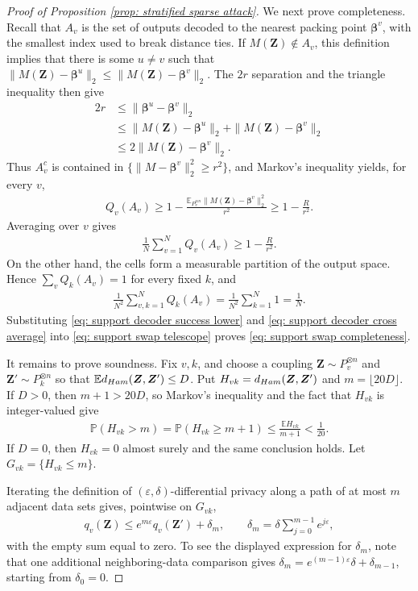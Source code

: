 \documentclass[letterpaper,12pt]{article}
\numberwithin{equation}{section}
\theoremstyle{plain}
\numberwithin{Theorem}{section}
\numberwithin{proposition}{section}
\numberwithin{Lemma}{section}
{
	\theoremstyle{definition}
	\newtheorem{Definition}{Definition}
	\newtheorem{example}{Example}
	\numberwithin{example}{section}
	\newtheorem{fact}{Fact}
	\numberwithin{fact}{section}
	\newtheorem{remark}{Remark}
}
\newcommand{\1}{\mathbbm{1}}
\def\bbeta{{\boldsymbol{\beta}}}
\def\Pr{\mathbb P}
\def\E{\mathbb{E}}
\begin{document}
\begin{proof}[Proof of Proposition \ref{prop: stratified sparse attack}]
We next prove completeness.  Recall that $A_v$ is the set of outputs decoded
to the nearest packing point $\bbeta^v$, with the smallest index used to break
distance ties.  If $M(\bm Z)\notin A_v$, this definition implies that there is
some $u\neq v$ such that
$\|M(\bm Z)-\bbeta^u\|_2\leq
\|M(\bm Z)-\bbeta^v\|_2$.  The $2r$ separation and the triangle
inequality then give
\begin{align*}
    2r
    &\leq\|\bbeta^u-\bbeta^v\|_2\\
    &\leq\|M(\bm Z)-\bbeta^u\|_2
          +\|M(\bm Z)-\bbeta^v\|_2\\
    &\leq2\|M(\bm Z)-\bbeta^v\|_2.
\end{align*}
Thus $A_v^c$ is contained in
$\{\|M-\bbeta^v\|_2^2\geq r^2\}$, and Markov's inequality yields,
for every $v$,
\begin{align*}
    Q_v(A_v)
    \geq1-\frac{\E_{P_v^{\otimes n}}
    \|M(\bm Z)-\bbeta^v\|_2^2}{r^2}
    \geq1-\frac{R}{r^2}.
\end{align*}
Averaging over $v$ gives
\begin{align}
    \frac1N\sum_{v=1}^NQ_v(A_v)\geq1-\frac{R}{r^2}.       \label{eq: support decoder success lower}
\end{align}
On the other hand, the cells form a measurable partition of the output
space.  Hence $\sum_vQ_k(A_v)=1$ for every fixed $k$, and
\begin{align}
    \frac1{N^2}\sum_{v,k=1}^NQ_k(A_v)
    =\frac1{N^2}\sum_{k=1}^N1
    =\frac1N.                                               \label{eq: support decoder cross average}
\end{align}
Substituting \eqref{eq: support decoder success lower} and
\eqref{eq: support decoder cross average} into
\eqref{eq: support swap telescope} proves
\eqref{eq: support swap completeness}.

It remains to prove soundness.  Fix $v,k$, and choose a coupling
$\bm Z\sim P_v^{\otimes n}$ and $\bm Z'\sim P_k^{\otimes n}$ so that
$\E d_{\rm Ham}(\bm Z,\bm Z')\leq D$.  Put
$H_{vk}=d_{\rm Ham}(\bm Z,\bm Z')$ and
$m=\lfloor20D\rfloor$.  If $D>0$, then $m+1>20D$, so Markov's
inequality and the fact that $H_{vk}$ is integer-valued give
\begin{align*}
    \Pr(H_{vk}>m)
    =\Pr(H_{vk}\geq m+1)
    \leq\frac{\E H_{vk}}{m+1}
    <\frac1{20}.
\end{align*}
If $D=0$, then $H_{vk}=0$ almost surely and the same conclusion holds.
Let $G_{vk}=\{H_{vk}\leq m\}$.

Iterating the definition of $(\varepsilon,\delta)$-differential
privacy along a path of at most $m$ adjacent data sets gives,
pointwise on $G_{vk}$,
\begin{align*}
    q_v(\bm Z)\leq e^{m\varepsilon}q_v(\bm Z')+\delta_m,
    \qquad
    \delta_m=\delta\sum_{j=0}^{m-1}e^{j\varepsilon},
\end{align*}
with the empty sum equal to zero.  To see the displayed expression for
$\delta_m$, note that one additional neighboring-data comparison gives
$\delta_m=e^{(m-1)\varepsilon}\delta+\delta_{m-1}$, starting from
$\delta_0=0$.


\end{proof}
\end{document}

